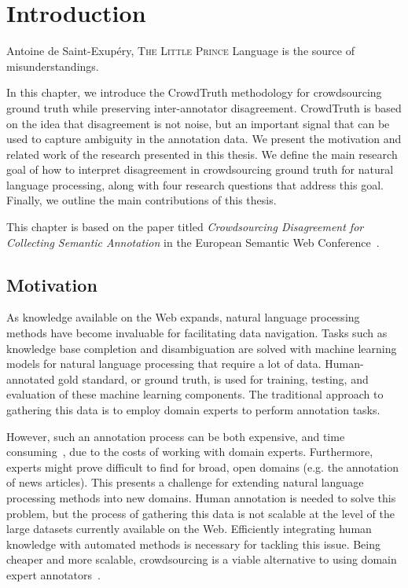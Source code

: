%
\chapter{Introduction}
\label{chap:intro}

\begin{chapquote}{Antoine de Saint-Exupéry, \textsc{The Little Prince}}
Language is the source of misunderstandings.
\end{chapquote}

In this chapter, we introduce the CrowdTruth methodology for crowdsourcing ground truth while preserving inter-annotator disagreement. CrowdTruth is based on the idea that disagreement is not noise, but an important signal that can be used to capture ambiguity in the annotation data. We present the motivation and related work of the research presented in this thesis. We define the main research goal of how to interpret disagreement in crowdsourcing ground truth for natural language processing, along with four research questions that address this goal. Finally, we outline the main contributions of this thesis.

This chapter is based on the paper titled \textit{Crowdsourcing Disagreement for Collecting Semantic Annotation} in the European Semantic Web Conference~\cite{dumitrache2015crowdsourcing}.


\section{Motivation}

As knowledge available on the Web expands, natural language processing methods have become invaluable for facilitating data navigation. Tasks such as knowledge base completion and disambiguation are solved with machine learning models for natural language processing that require a lot of data. Human-annotated gold standard, or ground truth, is used for training, testing, and evaluation of these machine learning components. The traditional approach to gathering this data is to employ domain experts to perform annotation tasks.

However, such an annotation process can be both expensive, and time consuming~\cite{aroyo2012harnessing}, due to the costs of working with domain experts. Furthermore, experts might prove difficult to find for broad, open domains (e.g. the annotation of news articles). This presents a challenge for extending natural language processing methods into new domains. Human annotation is needed to solve this problem, but the process of gathering this data is not scalable at the level of the large datasets currently available on the Web. Efficiently integrating human knowledge with automated methods is necessary for tackling this issue. Being cheaper and more scalable, crowdsourcing is a viable alternative to using domain expert annotators~\cite{Sabou:2012:CRO:2362456.2362479}.

